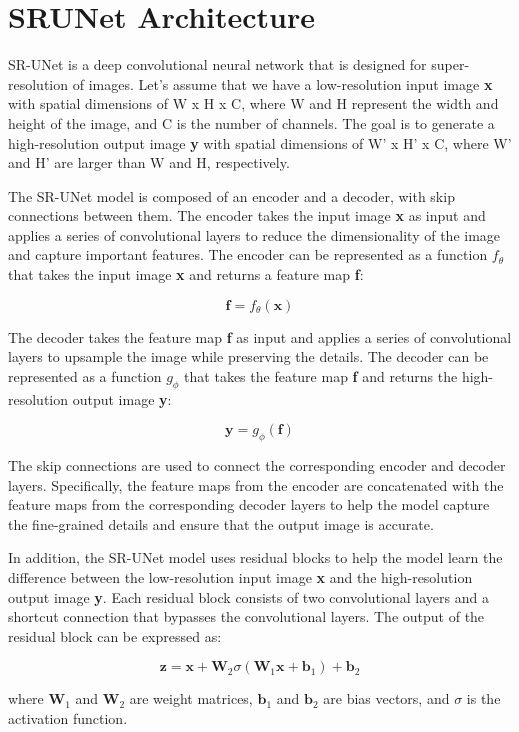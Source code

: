 \section{SRUNet Architecture}

SR-UNet is a deep convolutional neural network that is designed for super-resolution of images. Let's assume that we have a low-resolution input image \textbf{x} with spatial dimensions of W x H x C, where W and H represent the width and height of the image, and C is the number of channels. The goal is to generate a high-resolution output image \textbf{y} with spatial dimensions of W' x H' x C, where W' and H' are larger than W and H, respectively.

The SR-UNet model is composed of an encoder and a decoder, with skip connections between them. The encoder takes the input image \textbf{x} as input and applies a series of convolutional layers to reduce the dimensionality of the image and capture important features. The encoder can be represented as a function $f_\theta$ that takes the input image \textbf{x} and returns a feature map \textbf{f}:

$$ \textbf{f} = f_\theta(\textbf{x}) $$

The decoder takes the feature map \textbf{f} as input and applies a series of convolutional layers to upsample the image while preserving the details. The decoder can be represented as a function $g_\phi$ that takes the feature map \textbf{f} and returns the high-resolution output image \textbf{y}:

$$ \textbf{y} = g_\phi(\textbf{f}) $$

The skip connections are used to connect the corresponding encoder and decoder layers. Specifically, the feature maps from the encoder are concatenated with the feature maps from the corresponding decoder layers to help the model capture the fine-grained details and ensure that the output image is accurate.

In addition, the SR-UNet model uses residual blocks to help the model learn the difference between the low-resolution input image \textbf{x} and the high-resolution output image \textbf{y}. Each residual block consists of two convolutional layers and a shortcut connection that bypasses the convolutional layers. The output of the residual block can be expressed as:

$$ \textbf{z} = \textbf{x} + \textbf{W}_2\sigma(\textbf{W}_1\textbf{x}+\textbf{b}_1)+\textbf{b}_2 $$

where $\textbf{W}_1$ and $\textbf{W}_2$ are weight matrices, $\textbf{b}_1$ and $\textbf{b}_2$ are bias vectors, and $\sigma$ is the activation function.

